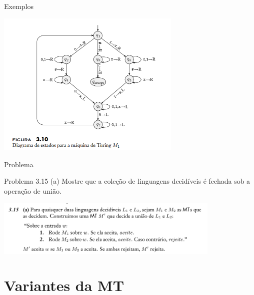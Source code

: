 \documentclass[xcolor=dvipsnames,table]{beamer}
\begin{document}
\begin{frame}{Exemplos}
\begin{center}
\includegraphics[height=7cm]{images/fig310.png}
\end{center}
\end{frame}

\begin{frame}{Problema}
\begin{block}{Problema 3.15 (a)}
	Mostre que a coleção de linguagens decidíveis é fechada sob a operação de união.		
\end{block} \pause
\begin{center}
	\includegraphics[height=2.7cm]{images/ex3-15a}
\end{center}
\end{frame}

\section{Variantes da MT}
\end{document}
